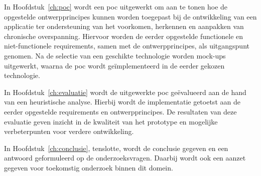 \vspace{1em}

In Hoofdstuk~\ref{ch:poc} wordt een \acrlong{poc} uitgewerkt om aan te tonen hoe de opgestelde ontwerpprincipes kunnen worden toegepast bij de ontwikkeling van een applicatie ter ondersteuning van het voorkomen, herkennen en aanpakken van chronische overspanning. Hiervoor worden de eerder opgestelde functionele en niet-functionele requirements, samen met de ontwerpprincipes, als uitgangspunt genomen. Na de selectie van een geschikte technologie worden mock-ups uitgewerkt, waarna de \acrshort{poc} wordt geïmplementeerd in de eerder gekozen technologie.

\vspace{1em}

In Hoofdstuk~\ref{ch:evaluatie} wordt de uitgewerkte \acrshort{poc} geëvalueerd aan de hand van een heuristische analyse. Hierbij wordt de implementatie getoetst aan de eerder opgestelde requirements en ontwerpprincipes. De resultaten van deze evaluatie geven inzicht in de kwaliteit van het prototype en mogelijke verbeterpunten voor verdere ontwikkeling.

\vspace{1em}

In Hoofdstuk~\ref{ch:conclusie}, tenslotte, wordt de conclusie gegeven en een antwoord geformuleerd op de onderzoeksvragen. Daarbij wordt ook een aanzet gegeven voor toekomstig onderzoek binnen dit domein.